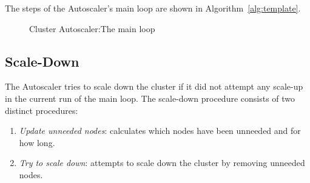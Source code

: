 The steps of the Autoscaler's main loop are shown in
Algorithm~\ref{alg:template}.

\clearpage


\clearpage
\begin{figure}[H]
      \centering
      \caption{Cluster Autoscaler:The main loop}
      \label{figure:autoscaler-main-loop}
\end{figure}


\subsection{Scale-Down}
\label{section:design-scale-down}
The Autoscaler tries to scale down the cluster if it did not attempt any
scale-up in the current run of the main loop. The scale-down procedure consists
of two distinct procedures:
\begin{enumerate}
      \tightlist
      \item \textit{Update unneeded nodes}: calculates which nodes have been
            unneeded and for how long.
      \item \textit{Try to scale down}: attempts to scale down the cluster by
            removing unneeded nodes.
\end{enumerate}

